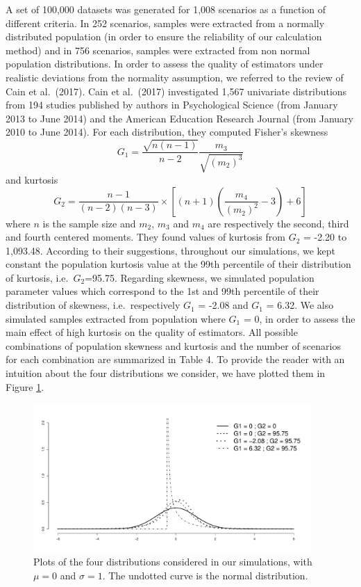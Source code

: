 \documentclass[
  english,
  man,floatsintext]{apa6}
\begin{document}
A set of 100,000 datasets was generated for 1,008 scenarios as a function of different criteria. In 252 scenarios, samples were extracted from a normally distributed population (in order to ensure the reliability of our calculation method) and in 756 scenarios, samples were extracted from non normal population distributions. In order to assess the quality of estimators under realistic deviations from the normality assumption, we referred to the review of Cain et al.~(2017). Cain et al.~(2017) investigated 1,567 univariate distributions from 194 studies published by authors in Psychological Science (from January 2013 to June 2014) and the American Education Research Journal (from January 2010 to June 2014). For each distribution, they computed Fisher's skewness
\[G_{1}=\frac{\sqrt{n(n-1)}}{n-2} \frac{m_{3}}{\sqrt{(m_{2})^3}}\]
and kurtosis \[G_{2}=\frac{n-1}{(n-2)(n-3)}\times \left[(n+1)\left(\frac{m_{4}}{(m_{2})^2}-3\right)+6\right]\]
where \(n\) is the sample size and \(m_{2}\), \(m_{3}\) and \(m_{4}\) are respectively the second, third and fourth centered moments. They found values of kurtosis from \(G_2\) = -2.20 to 1,093.48. According to their suggestions, throughout our simulations, we kept constant the population kurtosis value at the 99th percentile of their distribution of kurtosis, i.e.~\(G_2\)=95.75. Regarding skewness, we simulated population parameter values which correspond to the 1st and 99th percentile of their distribution of skewness, i.e.~respectively \(G_1\) = -2.08 and \(G_1\) = 6.32. We also simulated samples extracted from population where \(G_1\) = 0, in order to assess the main effect of high kurtosis on the quality of estimators. All possible combinations of population skewness and kurtosis and the number of scenarios for each combination are summarized in Table 4. To provide the reader with an intuition about the four distributions we consider, we have plotted them in Figure \ref{fig:DISTR}.

\begin{figure}
\includegraphics[width=400px]{ES_files/figure-latex/DISTR-1} \caption{Plots of the four distributions considered in our simulations, with $\mu=0$ and $\sigma=1$. The undotted curve is the normal distribution.}\label{fig:DISTR}
\end{figure}
\end{document}
